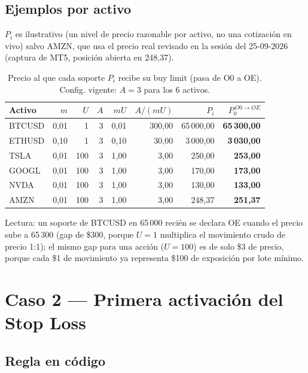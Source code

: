 \documentclass[11pt,a4paper]{article}
\begin{document}
\subsection{Ejemplos por activo}

$P_i$ es ilustrativo (un nivel de precio razonable por activo, no una cotización en
vivo) salvo AMZN, que usa el precio real revisado en la sesión del 25-09-2026
(captura de MT5, posición abierta en 248,37).

\begin{table}[h]
\centering
\small
\begin{tabularx}{\linewidth}{@{}l r r r r r r r@{}}
\toprule
\textbf{Activo} & $m$ & $U$ & $A$ & $mU$ & $A/(mU)$ & $P_i$ & $P_0^{\,O0\to OE}$ \\
\midrule
BTCUSD & 0,01 & 1   & 3 & 0,01 & 300,00 & 65\,000,00 & \textbf{65\,300,00} \\
ETHUSD & 0,10 & 1   & 3 & 0,10 & 30,00  & 3\,000,00  & \textbf{3\,030,00}  \\
TSLA   & 0,01 & 100 & 3 & 1,00 & 3,00   & 250,00     & \textbf{253,00}     \\
GOOGL  & 0,01 & 100 & 3 & 1,00 & 3,00   & 170,00     & \textbf{173,00}     \\
NVDA   & 0,01 & 100 & 3 & 1,00 & 3,00   & 130,00     & \textbf{133,00}     \\
AMZN   & 0,01 & 100 & 3 & 1,00 & 3,00   & 248,37     & \textbf{251,37}     \\
\bottomrule
\end{tabularx}
\caption{Precio al que cada soporte $P_i$ recibe su buy limit (pasa de O0 a OE). Config.
vigente: $A=3$ para los 6 activos.}
\end{table}

Lectura: un soporte de BTCUSD en 65\,000 recién se declara OE cuando el precio sube a
65\,300 (gap de \$300, porque $U=1$ multiplica el movimiento crudo de precio 1:1); el
mismo gap para una acción ($U=100$) es de solo \$3 de precio, porque cada \$1 de
movimiento ya representa \$100 de exposición por lote mínimo.

\section{Caso 2 --- Primera activación del Stop Loss}

\subsection{Regla en código}
\end{document}
